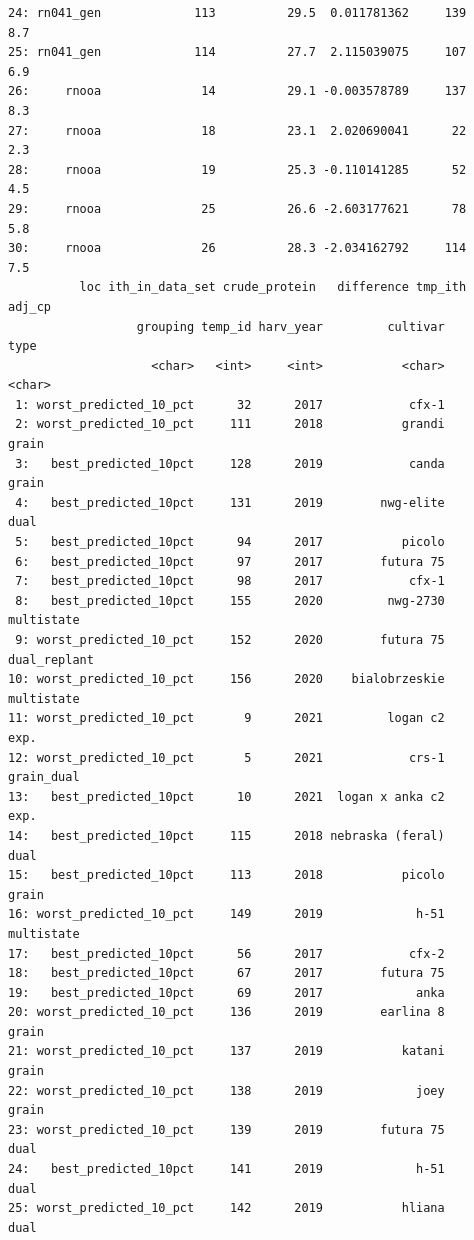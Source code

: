 \documentclass[
]{agujournal2019}
\begin{document}
\begin{verbatim}
24: rn041_gen             113          29.5  0.011781362     139    8.7
25: rn041_gen             114          27.7  2.115039075     107    6.9
26:     rnooa              14          29.1 -0.003578789     137    8.3
27:     rnooa              18          23.1  2.020690041      22    2.3
28:     rnooa              19          25.3 -0.110141285      52    4.5
29:     rnooa              25          26.6 -2.603177621      78    5.8
30:     rnooa              26          28.3 -2.034162792     114    7.5
          loc ith_in_data_set crude_protein   difference tmp_ith adj_cp
                  grouping temp_id harv_year         cultivar         type
                    <char>   <int>     <int>           <char>       <char>
 1: worst_predicted_10_pct      32      2017            cfx-1             
 2: worst_predicted_10_pct     111      2018           grandi        grain
 3:   best_predicted_10pct     128      2019            canda        grain
 4:   best_predicted_10pct     131      2019        nwg-elite         dual
 5:   best_predicted_10pct      94      2017           picolo             
 6:   best_predicted_10pct      97      2017        futura 75             
 7:   best_predicted_10pct      98      2017            cfx-1             
 8:   best_predicted_10pct     155      2020         nwg-2730   multistate
 9: worst_predicted_10_pct     152      2020        futura 75 dual_replant
10: worst_predicted_10_pct     156      2020    bialobrzeskie   multistate
11: worst_predicted_10_pct       9      2021         logan c2         exp.
12: worst_predicted_10_pct       5      2021            crs-1   grain_dual
13:   best_predicted_10pct      10      2021  logan x anka c2         exp.
14:   best_predicted_10pct     115      2018 nebraska (feral)         dual
15:   best_predicted_10pct     113      2018           picolo        grain
16: worst_predicted_10_pct     149      2019             h-51   multistate
17:   best_predicted_10pct      56      2017            cfx-2             
18:   best_predicted_10pct      67      2017        futura 75             
19:   best_predicted_10pct      69      2017             anka             
20: worst_predicted_10_pct     136      2019        earlina 8        grain
21: worst_predicted_10_pct     137      2019           katani        grain
22: worst_predicted_10_pct     138      2019             joey        grain
23: worst_predicted_10_pct     139      2019        futura 75         dual
24:   best_predicted_10pct     141      2019             h-51         dual
25: worst_predicted_10_pct     142      2019           hliana         dual

\end{verbatim}
\end{document}
